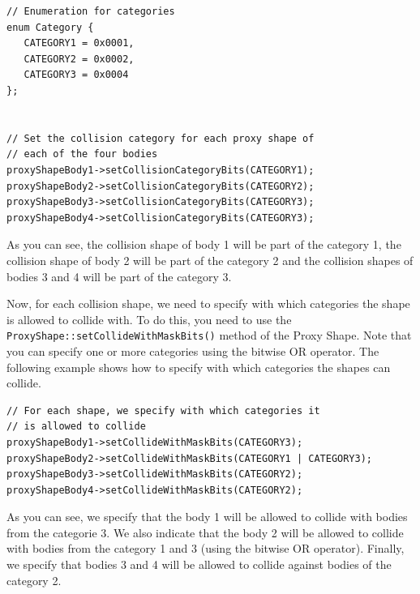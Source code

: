 \documentclass[a4paper,12pt]{article}
\begin{document}
    \begin{lstlisting}
// Enumeration for categories
enum Category {
   CATEGORY1 = 0x0001,
   CATEGORY2 = 0x0002,
   CATEGORY3 = 0x0004
};


// Set the collision category for each proxy shape of
// each of the four bodies
proxyShapeBody1->setCollisionCategoryBits(CATEGORY1);
proxyShapeBody2->setCollisionCategoryBits(CATEGORY2);
proxyShapeBody3->setCollisionCategoryBits(CATEGORY3);
proxyShapeBody4->setCollisionCategoryBits(CATEGORY3);
  \end{lstlisting}

    \vspace{0.6cm}

    As you can see, the collision shape of body 1 will be part of the category 1, the collision shape of body 2 will be part of the category 2 and the collision shapes of bodies 3 and 4 will be
    part of the category 3. \\

    \begin{sloppypar}
    Now, for each collision shape, we need to specify with which categories the shape is allowed to collide with. To do this, you need to use the \texttt{ProxyShape::setCollideWithMaskBits()}
    method of the Proxy Shape. Note that you can specify one or more categories using the bitwise OR operator. The following example shows how to specify with which categories the
    shapes can collide. \\
    \end{sloppypar}

    \begin{lstlisting}
// For each shape, we specify with which categories it
// is allowed to collide
proxyShapeBody1->setCollideWithMaskBits(CATEGORY3);
proxyShapeBody2->setCollideWithMaskBits(CATEGORY1 | CATEGORY3);
proxyShapeBody3->setCollideWithMaskBits(CATEGORY2);
proxyShapeBody4->setCollideWithMaskBits(CATEGORY2);
  \end{lstlisting}

    \vspace{0.6cm}

    As you can see, we specify that the body 1 will be allowed to collide with bodies from the categorie 3. We also indicate that the body 2 will be allowed to collide with bodies from the
    category 1 and 3 (using the bitwise OR operator). Finally, we specify that bodies 3 and 4 will be allowed to collide against bodies of the category 2. \\
\end{document}

